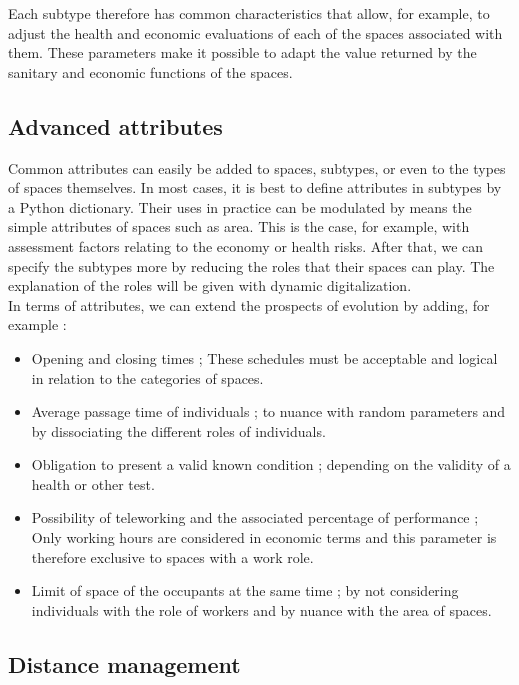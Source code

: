 Each subtype therefore has common characteristics that allow, for example, to adjust the health and economic evaluations of each of the spaces associated with them. These parameters make it possible to adapt the value returned by the sanitary and economic functions of the spaces. \\

\subsection{Advanced attributes}

Common attributes can easily be added to spaces, subtypes, or even to the types of spaces themselves. In most cases, it is best to define attributes in subtypes by a Python dictionary. Their uses in practice can be modulated by means the simple attributes of spaces such as area. This is the case, for example, with assessment factors relating to the economy or health risks. After that, we can specify the subtypes more by reducing the roles that their spaces can play. The explanation of the roles will be given with dynamic digitalization.\\

In terms of attributes, we can extend the prospects of evolution by adding, for example :\\

\begin{itemize}
\item Opening and closing times ; These schedules must be acceptable and logical in relation to the categories of spaces.
\item Average passage time of individuals ; to nuance with random parameters and by dissociating the different roles of individuals.
\item Obligation to present a valid known condition ; depending on the validity of a health or other test.
\item Possibility of teleworking and the associated percentage of performance ; Only working hours are considered in economic terms and this parameter is therefore exclusive to spaces with a work role.
\item Limit of space of the occupants at the same time ; by not considering individuals with the role of workers and by nuance with the area of spaces.\\
\end{itemize}

\subsection{Distance management}

